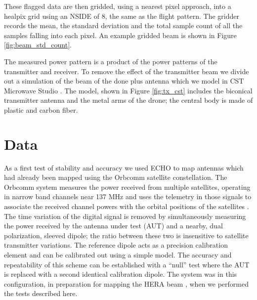 \documentclass[preprint2,numberedappendix,tighten,twocolappendix]{aastex6}
\begin{document}
These flagged data are then gridded, using a nearest pixel approach, into a healpix grid using an NSIDE of 8, the same as the flight pattern.  The gridder records the mean, the standard deviation and the total sample count of all the samples falling into each pixel. An example gridded beam is shown in Figure \ref{fig:beam_std_count}.

The measured power pattern is a product of the power patterns of the transmitter and receiver. To remove the effect of the transmitter beam we divide out a simulation of the beam of the done plus antenna which we model in CST Microwave Studio . The model, shown in Figure \ref{fig:tx_cst} includes the biconical transmitter antenna and the metal arms of the drone; the central body is made of plastic and carbon fiber.  

  




\section{Data}
As a first test of stability and accuracy we used ECHO to map antennas which had already been mapped using the Orbcomm satellite constellation.  The Orbcomm system measures the power received from multiple satellites, operating in narrow band channels near 137 MHz and uses the telemetry in those signals to associate the received channel powers with the orbital positions of the satellites \citep{2015RaSc...50..614N}.   The time variation of the digital signal is removed by simultaneously measuring the power received by the antenna under test (AUT) and a nearby, dual polarization, sleeved dipole; the ratio between these two is insensitive to satellite transmitter variations. The reference dipole acts as a precision calibration element and can be calibrated out using a simple model.  The accuracy and repeatability of this scheme can be established with a ``null'' test where the AUT is replaced with a second identical calibration dipole.  The system was in this configuration, in preparation for mapping the HERA beam \citep{Neben2016_HERAOrbcomm}, when we performed the tests described here.  
\end{document}
